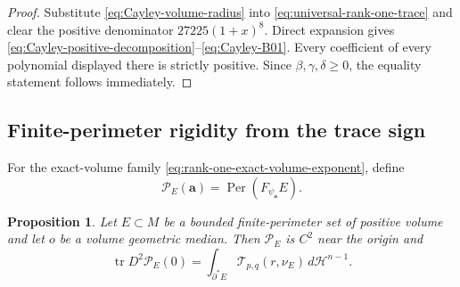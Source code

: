 \documentclass[11pt,reqno]{amsart}
\numberwithin{equation}{section}
\newtheorem{proposition}[theorem]{Proposition}
\theoremstyle{definition}
\theoremstyle{remark}
\newcommand{\Per}{\operatorname{Per}}
\begin{document}
\begin{proof}
Substitute \eqref{eq:Cayley-volume-radius} into
\eqref{eq:universal-rank-one-trace} and clear the positive denominator
$27225(1+x)^8$.  Direct expansion gives
\eqref{eq:Cayley-positive-decomposition}--\eqref{eq:Cayley-B01}.  Every
coefficient of every polynomial displayed there is strictly positive.  Since
$\beta,\gamma,\delta\ge0$, the equality statement follows immediately.
\end{proof}


\subsection{Finite-perimeter rigidity from the trace sign}

For the exact-volume family \eqref{eq:rank-one-exact-volume-exponent}, define
\[
 \mathscr P_E(\mathbf a)=\Per(F_{\psi_{\mathbf a}}E).
\]

\begin{proposition}
\label{prop:rank-one-exact-volume-trace}
Let $E\subset M$ be a bounded finite-perimeter set of positive volume and let
$o$ be a volume geometric median.  Then $\mathscr P_E$ is $C^2$ near the
origin and
\begin{equation}
 \operatorname{tr}D^2\mathscr P_E(0)
 =\int_{\partial^*E}\mathscr T_{p,q}(r,\nu_E)\,d\mathcal H^{n-1}.
\label{eq:rank-one-perimeter-Hessian-trace}
\end{equation}
\end{proposition}
\end{document}
